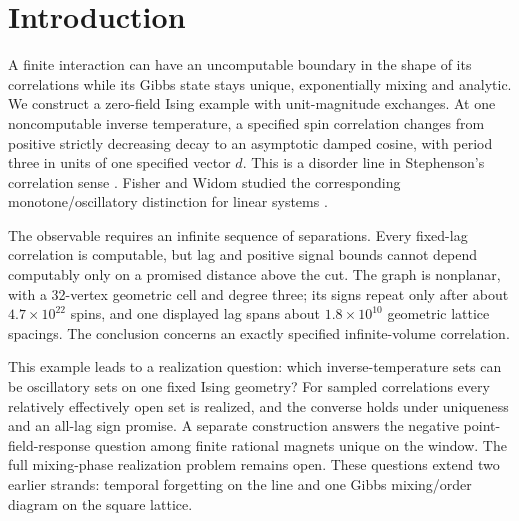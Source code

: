 \section{Introduction}\label{sec:introduction}

A finite interaction can have an uncomputable boundary in the shape of its correlations while its Gibbs state stays unique, exponentially mixing and analytic. We construct a zero-field Ising example with unit-magnitude exchanges. At one noncomputable inverse temperature, a specified spin correlation changes from positive strictly decreasing decay to an asymptotic damped cosine, with period three in units of one specified vector \(d\). This is a disorder line in Stephenson's correlation sense \cite{stephenson}. Fisher and Widom studied the corresponding monotone/oscillatory distinction for linear systems \cite{fisherWidom}.

The observable requires an infinite sequence of separations. Every fixed-lag correlation is computable, but lag and positive signal bounds cannot depend computably only on a promised distance above the cut. The graph is nonplanar, with a 32-vertex geometric cell and degree three; its signs repeat only after about \(4.7\times10^{22}\) spins, and one displayed lag spans about \(1.8\times10^{10}\) geometric lattice spacings. The conclusion concerns an exactly specified infinite-volume correlation.

This example leads to a realization question: which inverse-temperature sets can be oscillatory sets on one fixed Ising geometry? For sampled correlations every relatively effectively open set is realized, and the converse holds under uniqueness and an all-lag sign promise. A separate construction answers the negative point-field-response question among finite rational magnets unique on the window. The full mixing-phase realization problem remains open. These questions extend two earlier strands: temporal forgetting on the line and one Gibbs mixing/order diagram on the square lattice.

